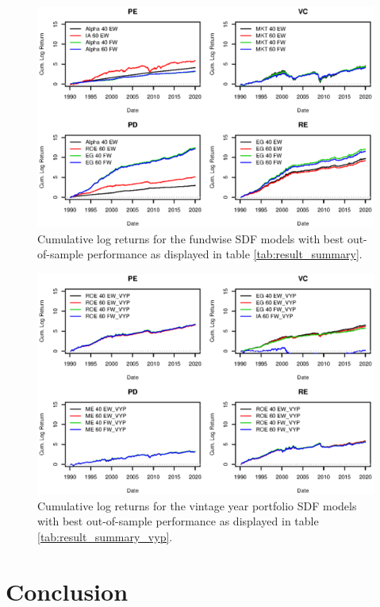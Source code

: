 \documentclass[12pt]{article}
\begin{document}
\begin{figure}[h]
	\centering
	\includegraphics{eps/0_SDF_realizations}
	\caption{Cumulative log returns for the fundwise SDF models with best out-of-sample performance as displayed in table \ref{tab:result_summary}.
}
	\label{fig:sdf_log_returns}
\end{figure}


\begin{figure}[h]
	\centering
	\includegraphics{eps/0_SDF_realizations_VYP}
	\caption{Cumulative log returns for the vintage year portfolio SDF models with best out-of-sample performance as displayed in table \ref{tab:result_summary_vyp}.
	}
	\label{fig:sdf_log_returns_vyp}
\end{figure}


\section{Conclusion}
\label{sec:conclusion}
\end{document}
